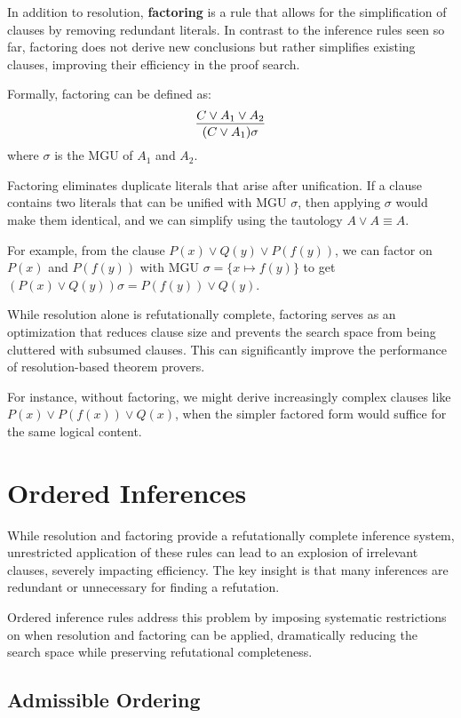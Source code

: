 In addition to resolution, \textbf{factoring} is a rule that allows for the simplification of clauses by removing redundant literals.
In contrast to the inference rules seen so far, factoring does not derive new conclusions but rather simplifies existing clauses, improving their efficiency in the proof search.

Formally, factoring can be defined as:
\begin{equation}
  \infer{(C \lor A_1)\sigma}{C \lor A_1 \lor A_2}
\end{equation}
where \(\sigma\) is the MGU of \(A_1\) and \(A_2\).

Factoring eliminates duplicate literals that arise after unification. If a clause contains two literals that can be unified with MGU \(\sigma\), then applying \(\sigma\) would make them identical, and we can simplify using the tautology \(A \lor A \equiv A\).

For example, from the clause \(P(x) \lor Q(y) \lor P(f(y))\), we can factor on \(P(x)\) and \(P(f(y))\) with MGU \(\sigma = \{x \mapsto f(y)\}\) to get \((P(x) \lor Q(y))\sigma = P(f(y)) \lor Q(y)\).

While resolution alone is refutationally complete, factoring serves as an optimization that reduces clause size and prevents the search space from being cluttered with subsumed clauses. This can significantly improve the performance of resolution-based theorem provers.

For instance, without factoring, we might derive increasingly complex clauses like \(P(x) \lor P(f(x)) \lor Q(x)\), when the simpler factored form would suffice for the same logical content.

\section{Ordered Inferences}

While resolution and factoring provide a refutationally complete inference system, unrestricted application of these rules can lead to an explosion of irrelevant clauses, severely impacting efficiency. The key insight is that many inferences are redundant or unnecessary for finding a refutation.

Ordered inference rules address this problem by imposing systematic restrictions on when resolution and factoring can be applied, dramatically reducing the search space while preserving refutational completeness.

\subsection{Admissible Ordering}

